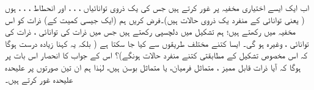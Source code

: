  اب ایک  ایسے اختیاری  مخفیہ پر غور کرتے ہیں  جس کی یک ذروی  توانائیاں ،   ،  ،  اور   انحطاط ،  ،  ،   ہوں ( یعنی توانائی  کے  منفرد یک ذروی حالات ہیں)۔فرض کریں ہم (ایک جیسی کمیت  کے)   ذرات کو اس ‏مخفیہ میں رکھتے ہیں؛  ہم تشکیل  میں دلچسپی رکھتے ہیں جس میں   ذرات کی توانائی ،   ذرات کی توانائی ،  وغیرہ  ہو گی۔ ایسا کتنے مختلف طریقوں سے کیا جا سکتا ہے ( بلکہ یہ کہنا زیادہ درست ہوگا کہ اس مخصوص تشکیل کے  مطابقتی کتنے منفرد حالات ہونگے)؟   اس کے  جواب  کا انحصار  اس بات پر  ہوگا کہ آیا ذرات قابل ممیز ، متماثل فرميان،  یا متماثل بوسن ہیں،  لہٰذا ہم ان تین صورتوں پر علیحدہ علیحدہ غور کرتے ہیں۔
 
